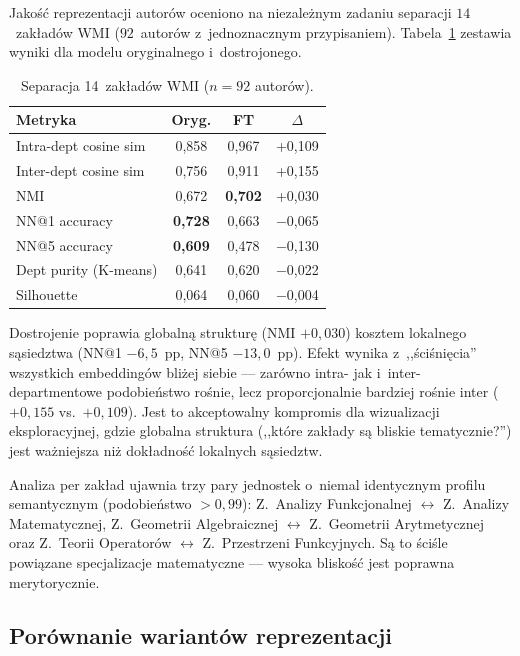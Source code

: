 \documentclass[a4paper,11pt,twocolumn]{article}
\begin{document}
Jakość reprezentacji autorów oceniono na niezależnym zadaniu separacji
$14$~zakładów WMI ($92$~autorów z~jednoznacznym przypisaniem).
Tabela~\ref{tab:dept} zestawia wyniki dla modelu oryginalnego
i~dostrojonego.

\begin{table}[t]
\centering
\caption{Separacja 14~zakładów WMI ($n=92$ autorów).}
\label{tab:dept}
\small
\begin{tabular}{@{}lccc@{}}
\toprule
Metryka & Oryg. & FT & $\Delta$ \\
\midrule
Intra-dept cosine sim    & 0,858 & 0,967 & +0,109 \\
Inter-dept cosine sim    & 0,756 & 0,911 & +0,155 \\
NMI                      & 0,672 & \textbf{0,702} & +0,030 \\
NN@1 accuracy            & \textbf{0,728} & 0,663 & $-$0,065 \\
NN@5 accuracy            & \textbf{0,609} & 0,478 & $-$0,130 \\
Dept purity (K-means)    & 0,641 & 0,620 & $-$0,022 \\
Silhouette               & 0,064 & 0,060 & $-$0,004 \\
\bottomrule
\end{tabular}
\end{table}

Dostrojenie poprawia globalną strukturę (NMI $+0{,}030$) kosztem
lokalnego sąsiedztwa (NN@1 $-6{,}5$~pp, NN@5 $-13{,}0$~pp). Efekt
wynika z~,,ściśnięcia'' wszystkich embeddingów bliżej siebie --- zarówno
intra- jak i~inter-departmentowe podobieństwo rośnie, lecz
proporcjonalnie bardziej rośnie inter ($+0{,}155$ vs.\ $+0{,}109$).
Jest to akceptowalny kompromis dla wizualizacji eksploracyjnej,
gdzie globalna struktura (,,które zakłady są bliskie tematycznie?'')
jest ważniejsza niż dokładność lokalnych sąsiedztw.

Analiza per zakład ujawnia trzy pary jednostek o~niemal identycznym
profilu semantycznym (podobieństwo $> 0{,}99$): Z.~Analizy Funkcjonalnej
$\leftrightarrow$ Z.~Analizy Matematycznej, Z.~Geometrii Algebraicznej
$\leftrightarrow$ Z.~Geometrii Arytmetycznej oraz Z.~Teorii Operatorów
$\leftrightarrow$ Z.~Przestrzeni Funkcyjnych. Są to ściśle powiązane
specjalizacje matematyczne --- wysoka bliskość jest poprawna merytorycznie.

\subsection{Porównanie wariantów reprezentacji}
\end{document}
